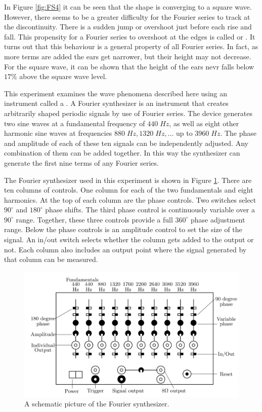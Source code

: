 \noindent In Figure \ref{fig:FS4} it can be seen that the shape is converging to a square wave. However, there seems to be a greater difficulty for the Fourier series to track at the discontinuity. There is a sudden jump or overshoot just before each rise and fall. This propensity for a Fourier series to overshoot at the edges is called  or . It turns out that this behaviour is a general property of all Fourier series. In fact, as more terms are added the ears get narrower, but their height may not decrease. For the square wave, it can be shown that the height of the ears nevr falls below $17\%$ above the square wave level.

\noindent This experiment examines the wave phenomena described here using an instrument called a . A Fourier synthesizer is an instrument that creates arbitrarily shaped periodic signals by use of Fourier series. The device generates two sine waves at a fundamental frequency of $440\;Hz$, as well as eight other harmonic sine waves at frequencies $880\;Hz, 1320\;Hz,...$ up to $3960\;Hz$. The phase and amplitude of each of these ten signals can be independently adjusted. Any combination of them can be added together. In this way the synthesizer can generate the first nine terms of any Fourier series.

\noindent The Fourier synthesizer used in this experiment is shown in Figure \ref{fig:FS5}. There are ten columns of controls. One column for each of the two fundamentals and eight harmonics. At the top of each column are the phase controls. Two switches select $90^{\circ}$ and $180^{\circ}$ phase shifts. The third phase control is continuously variable over a $90^{\circ}$ range. Together, these three controls provide a full $360^{\circ}$ phase adjustment range. Below the phase controls is an amplitude control to set the size of the signal. An in/out switch selects whether the column gets added to the output or not. Each column also includes an output point where the signal generated by that column can be measured.

\begin{figure}[H]
    \centering
    \includegraphics[scale = 0.8]{Images/FS5.PNG}
    \caption{A schematic picture of the Fourier synthesizer.}
    \label{fig:FS5}
\end{figure}

